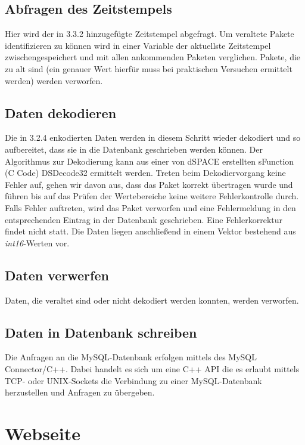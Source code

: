 \documentclass[fontsize = 12pt, paper = a4]{scrreprt}
\begin{document}
\subsection{Abfragen des Zeitstempels}

Hier wird der in 3.3.2 hinzugefügte Zeitstempel abgefragt. Um veraltete Pakete identifizieren zu können wird in einer Variable der aktuellste Zeitstempel zwischengespeichert und mit allen ankommenden Paketen verglichen. Pakete, die zu alt sind (ein genauer Wert hierfür muss bei praktischen Versuchen ermittelt werden) werden verworfen. 

\subsection{Daten dekodieren}

Die in 3.2.4 enkodierten Daten werden in diesem Schritt wieder dekodiert und so aufbereitet, dass sie in die Datenbank geschrieben werden können. Der Algorithmus zur Dekodierung kann aus einer von dSPACE erstellten sFunction (C Code) DSDecode32 ermittelt werden. Treten beim Dekodiervorgang keine Fehler auf, gehen wir davon aus, dass das Paket korrekt übertragen wurde und führen bis auf das Prüfen der Wertebereiche keine weitere Fehlerkontrolle durch. Falls Fehler auftreten, wird das Paket verworfen und eine Fehlermeldung in den entsprechenden Eintrag in der Datenbank geschrieben. Eine Fehlerkorrektur findet nicht statt. Die Daten liegen anschließend in einem Vektor bestehend aus \textit{int16}-Werten vor. 

\subsection{Daten verwerfen}

Daten, die veraltet sind oder nicht dekodiert werden konnten, werden verworfen. 

\subsection{Daten in Datenbank schreiben}

Die Anfragen an die MySQL-Datenbank erfolgen mittels des MySQL Connector/C++. Dabei handelt es sich um eine C++ API die es erlaubt mittels TCP- oder UNIX-Sockets die Verbindung zu einer MySQL-Datenbank herzustellen und Anfragen zu übergeben. 

\newpage

\section{Webseite}
\end{document}
